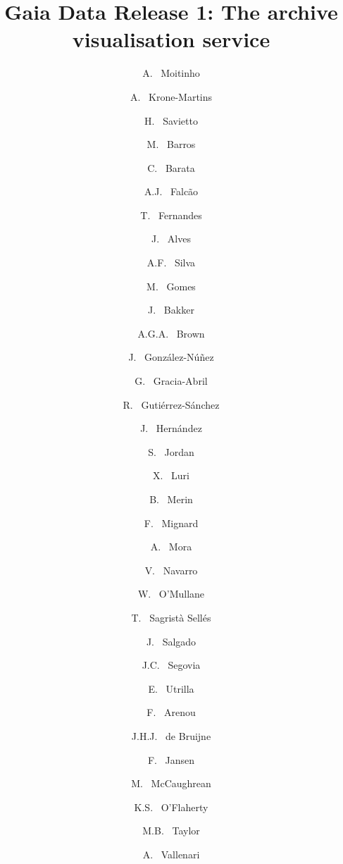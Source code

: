 \documentclass[longauth, final]{aa}
\begin{document}
\title{Gaia Data Release 1: The archive visualisation service}

\author{
A.        ~Moitinho                      \inst{\ref{inst:0119}}\relax
\and A.        ~Krone-Martins                 \inst{\ref{inst:0119}}\relax
\and H.        ~Savietto                      \inst{\ref{inst:0469}}\relax
\and M.        ~Barros                        \inst{\ref{inst:0119}}\relax
\and C.        ~Barata                        \inst{\ref{inst:0119}}\relax
\and A.J.      ~Falc\~{a}o                    \inst{\ref{inst:0263}}\relax
\and T.        ~Fernandes                     \inst{\ref{inst:0263}}\relax
\and J.        ~Alves                         \inst{\ref{inst:0145}}\relax
\and A.F.        ~Silva                        \inst{\ref{inst:0119}}\relax
\and M.        ~Gomes                         \inst{\ref{inst:0119}}\relax
\and J.        ~Bakker
\inst{\ref{inst:ESAC}}\relax
\and A.G.A.    ~Brown                         \inst{\ref{inst:0003}}\relax
\and J.        ~Gonz\'{a}lez-N\'{u}\~{n}ez    \inst{\ref{inst:0048},\ref{inst:0299}}\relax
\and G.        ~Gracia-Abril                  \inst{\ref{inst:0067},\ref{inst:0012}}\relax
\and R.        ~Guti\'{e}rrez-S\'{a}nchez     \inst{\ref{inst:0026}}\relax
\and J.        ~Hern\'{a}ndez                 \inst{\ref{inst:0014}}\relax
\and S.        ~Jordan                        \inst{\ref{inst:0007}}\relax
\and X.        ~Luri                          \inst{\ref{inst:0012}}\relax
\and B.        ~Merin              
\inst{\ref{inst:ESAC}}\relax
\and F.        ~Mignard                       \inst{\ref{inst:0017}}\relax
\and A.        ~Mora                          \inst{\ref{inst:0111}}\relax
\and V.        ~Navarro
\inst{\ref{inst:ESAC}}\relax
\and W.        ~O'Mullane                     \inst{\ref{inst:0014}}\relax
\and T.        ~Sagrist\`{a} Sell\'{e}s       \inst{\ref{inst:0007}}\relax
\and J.        ~Salgado                       \inst{\ref{inst:0122}}\relax
\and J.C.      ~Segovia                       \inst{\ref{inst:0048}}\relax
\and E.        ~Utrilla                       \inst{\ref{inst:0111}}\relax
\and F.        ~Arenou                        \inst{\ref{inst:0005}}\relax
\and J.H.J.    ~de Bruijne                    \inst{\ref{inst:0001}}\relax
\and F.        ~Jansen                        \inst{\ref{inst:0011}}\relax
\and M.        ~McCaughrean           \inst{\ref{inst:ESTEC}}\relax
\and K.S.      ~O'Flaherty                    \inst{\ref{inst:0635}}\relax
\and M.B.      ~Taylor                        \inst{\ref{inst:0503}}\relax
\and A.        ~Vallenari                     \inst{\ref{inst:0004}}\relax
}
\end{document}
